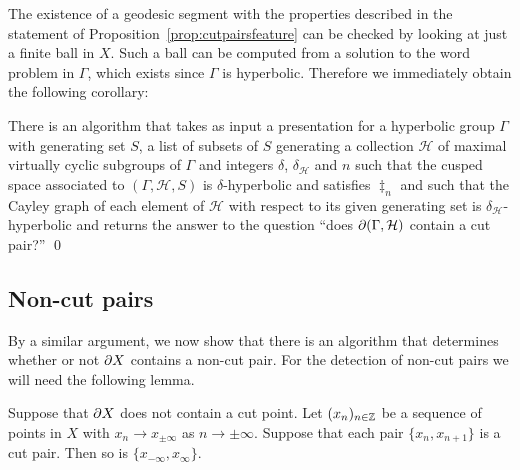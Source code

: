 The existence of a geodesic segment with the properties described in the statement of
Proposition~\ref{prop:cutpairsfeature} can be checked by looking at just a
finite ball in $X$. Such a ball can be computed from a solution to the word
problem in $\Gamma$, which exists since $\Gamma$ is hyperbolic. Therefore we
immediately obtain the following corollary:

\begin{cor}\label{cor:cutpaircomputable} There is an algorithm that takes as
input a presentation for a hyperbolic group $\Gamma$ with generating set $S$,
a list of subsets of $S$ generating a collection $\mathcal{H}$ of maximal virtually cyclic
subgroups of $\Gamma$ and integers $\delta$, $\delta_\mathcal{H}$ and $n$ such that the
cusped space associated to $(\Gamma, \mathcal{H}, S)$ is $\delta$-hyperbolic
and satisfies $\ddag_n$ and such that the Cayley graph of each element of
$\mathcal{H}$ with respect to its given generating set is
$\delta_\mathcal{H}$-hyperbolic and returns the answer to the question ``does
$\partial(\Gamma, \mathcal{H})$ contain a cut pair?'' \qed \end{cor}

\subsection{Non-cut pairs}

By a similar argument, we now show that there is an algorithm that determines
whether or not $\partial X$ contains a non-cut pair. For the detection of
non-cut pairs we will need the following lemma.

\begin{lem}\label{lem:equivalenceclass} Suppose that $\partial X$ does not
contain a cut point. Let $(x_n)_{n \in \mathbb{Z}}$ be a sequence of points in
$X$ with $x_n \to x_{\pm \infty}$ as $n\to \pm \infty$. Suppose that each
pair $\{x_n, x_{n+1}\}$ is a cut pair. Then so is $\{x_{-\infty},
x_\infty\}$.  \end{lem}

